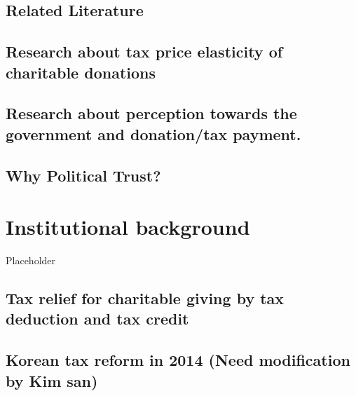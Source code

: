\documentclass[ review  , 3p ]{elsarticle}
\begin{document}
  \hypertarget{related-literature}{%
  \subsection{Related Literature}\label{related-literature}}
  
  \hypertarget{research-about-tax-price-elasticity-of-charitable-donations}{%
  \subsection{Research about tax price elasticity of charitable donations}\label{research-about-tax-price-elasticity-of-charitable-donations}}
  
  \hypertarget{research-about-perception-towards-the-government-and-donationtax-payment.}{%
  \subsection{Research about perception towards the government and donation/tax payment.}\label{research-about-perception-towards-the-government-and-donationtax-payment.}}
  
  \hypertarget{why-political-trust}{%
  \subsection{Why Political Trust?}\label{why-political-trust}}
  
  \hypertarget{institutional-background}{%
  \section{Institutional background}\label{institutional-background}}
  
  Placeholder
  
  \hypertarget{tax-relief-for-charitable-giving-by-tax-deduction-and-tax-credit}{%
  \subsection{Tax relief for charitable giving by tax deduction and tax credit}\label{tax-relief-for-charitable-giving-by-tax-deduction-and-tax-credit}}
  
  \hypertarget{korean-tax-reform-in-2014-need-modification-by-kim-san}{%
  \subsection{Korean tax reform in 2014 (Need modification by Kim san)}\label{korean-tax-reform-in-2014-need-modification-by-kim-san}}
  
\end{document}
